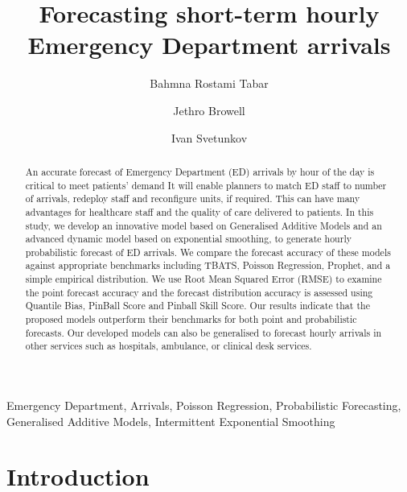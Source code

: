 \documentclass[]{elsarticle} %
\begin{document}
\begin{frontmatter}

  \title{Forecasting short-term hourly Emergency Department arrivals}
    \author[Cardiff Business School]{Bahmna Rostami Tabar}
    \author[University of Glasgow]{Jethro Browell}
    \author[Lancaster University]{Ivan Svetunkov}
      \address[Cardiff Business School]{Cardiff Business School, Cardiff University, UK}
    \address[University of Glasgow]{School of Mathematics and Statistics, University of Glasgow, UK}
    \address[Lancaster University]{Centre for Marketing Analytics and Forecasting, Lancaster University, UK}
  
  \begin{abstract}
  An accurate forecast of Emergency Department (ED) arrivals by hour of the day is critical to meet patients' demand It will enable planners to match ED staff to number of arrivals, redeploy staff and reconfigure units, if required. This can have many advantages for healthcare staff and the quality of care delivered to patients. In this study, we develop an innovative model based on Generalised Additive Models and an advanced dynamic model based on exponential smoothing, to generate hourly probabilistic forecast of ED arrivals. We compare the forecast accuracy of these models against appropriate benchmarks including TBATS, Poisson Regression, Prophet, and a simple empirical distribution. We use Root Mean Squared Error (RMSE) to examine the point forecast accuracy and the forecast distribution accuracy is assessed using Quantile Bias, PinBall Score and Pinball Skill Score. Our results indicate that the proposed models outperform their benchmarks for both point and probabilistic forecasts. Our developed models can also be generalised to forecast hourly arrivals in other services such as hospitals, ambulance, or clinical desk services.
  \end{abstract}
   \begin{keyword} Emergency Department, Arrivals, Poisson Regression, Probabilistic Forecasting, Generalised Additive Models, Intermittent Exponential Smoothing\end{keyword}
 \end{frontmatter}

\hypertarget{introduction}{%
\section{Introduction}\label{introduction}}
\end{document}
